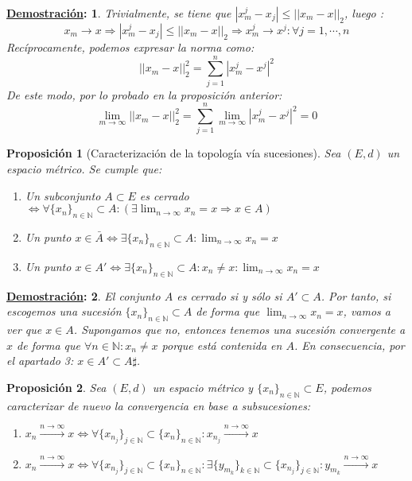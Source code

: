 \documentclass[10pt,a4paper,openright]{book}
\theoremstyle{break}
\newtheorem*{prop}{Proposición}
\newtheorem*{demo}{\underline{Demostración}:}
\begin{document}
\begin{demo}
Trivialmente, se tiene que $|x_m^j - x_j| \leq ||x_m - x||_2$, luego :
$$x_m \rightarrow x \Rightarrow |x_m^j - x_j| \leq ||x_m - x||_2 \Rightarrow x_m^j \rightarrow x^j : \forall j = 1, \cdots, n$$
Recíprocamente, podemos expresar la norma como:
$$||x_m - x||_2^2 = \sum_{j=1}^{n} |x_m^j - x^j|^2$$
De este modo, por lo probado en la proposición anterior:
$$\lim_{m \rightarrow \infty} ||x_m - x||_2^2 = \sum_{j=1}^{n} \lim_{m \rightarrow \infty} |x_m^j - x^j|^2 = 0$$
\end{demo}

\begin{prop}[Caracterización de la topología vía sucesiones]
Sea $(E,d)$ un espacio métrico. Se cumple que:
\begin{enumerate}
\item Un subconjunto $A \subset E$ es cerrado $\Leftrightarrow \forall \{x_n\}_{n\in \mathbb{N}} \subset A : \left(\exists \lim_{n \rightarrow \infty} x_n = x \Rightarrow x \in A\right)$

\item Un punto $x \in \bar{A} \Leftrightarrow \exists \{x_n\}_{n\in \mathbb{N}} \subset A : \lim_{n \rightarrow \infty} x_n = x$

\item Un punto $x \in A' \Leftrightarrow \exists \{x_n\}_{n\in \mathbb{N}} \subset A : x_n \neq x: \lim_{n \rightarrow \infty} x_n = x$
\end{enumerate}
\end{prop}

\begin{demo}
El conjunto $A$ es cerrado si y sólo si $A' \subset A$. Por tanto, si escogemos una sucesión $\{x_n\}_{n\in \mathbb{N}} \subset A$ de forma que $\lim_{n \rightarrow \infty} x_n = x$, vamos a ver que $x\in A$. Supongamos que no, entonces tenemos una sucesión convergente a $x$ de forma que $\forall n \in \mathbb N: x_n \neq x$ porque está contenida en $A$. En consecuencia, por el apartado 3: $x \in A' \subset A \sharp$.
\end{demo}

\begin{prop}
Sea $(E,d)$ un espacio métrico y $\{x_n\}_{n\in \mathbb{N}} \subset E$, podemos caracterizar de nuevo la convergencia en base a subsucesiones:
\begin{enumerate}
\item $x_n \xrightarrow{n\rightarrow\infty} x \Leftrightarrow \forall\{x_{n_j}\}_{j \in \mathbb{N}} \subset \{x_n\}_{n\in \mathbb{N}} : x_{n_j} \xrightarrow{n\rightarrow\infty} x$ 

\item $x_n \xrightarrow{n\rightarrow\infty} x \Leftrightarrow \forall\{x_{n_j}\}_{j \in \mathbb{N}} \subset \{x_n\}_{n\in \mathbb{N}} : \exists \{y_{m_k}\}_{k \in \mathbb{N}} \subset \{x_{n_j}\}_{j \in \mathbb{N}} : y_{m_k} \xrightarrow{n\rightarrow \infty} x$
\end{enumerate}
\end{prop}
\end{document}
